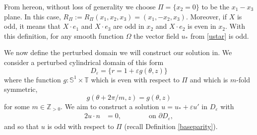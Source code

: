 \documentclass[11pt]{article}
\theoremstyle{plain}
\numberwithin{equation}{section}
\theoremstyle{remark}
\newcommand{\ve}{{\varepsilon}}
\newcommand{\pa}{\partial}
\begin{document}
    From hereon, without loss of generality we choose $\Pi =\{x_2=0\}$ to be the $x_1-x_3$ plane. In this case, $R_\Pi:=R_ \Pi(x_1, x_2, x_3) = (x_1, -x_2, x_3)$.
Moreover, if $X$ is odd, it means that $X\cdot e_1$ and $X\cdot e_3$ are odd in $x_2$
    and $X\cdot e_2$ is even in $x_2$.   With this definition,
    for any smooth function $\Omega$ the vector field $u_*$ from \eqref{ustar} is
    odd.




We now define the perturbed domain we will construct our solution in.
We consider a perturbed cylindrical domain of this form
\begin{equation}
  \label{dvedef}
  D_\ve = \{r = 1 + \ve g(\theta, z)\}
\end{equation}
where the function $g: \mathbb{S}^1 \times \mathbb{T}$ which is even with respect to 
$\Pi$
and which is $m$-fold symmetric,
\begin{equation}
  \label{}
  g( \theta + 2\pi/m,z) =   g( \theta ,z) 
\end{equation}
for some $m \in \mathbb{Z}_{>0}$.  We aim to construct a solution $u = u_* + \ve u'$ in $D_\ve$
with 
\begin{alignat}{2}
    \label{eul3}
  u\cdot n &= 0, &&\qquad \text{ on } \pa D_\ve,
\end{alignat}
and so that $u$ is odd 
with respect to $\Pi$ (recall Definition \ref{baseparity}).
\end{document}
